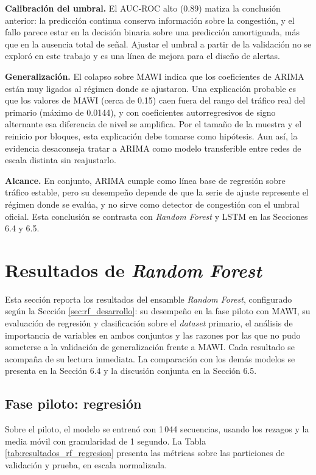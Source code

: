 \documentclass[12pt]{report}
\begin{document}
\textbf{Calibración del umbral.} El AUC-ROC alto (0.89) matiza la conclusión anterior: la predicción continua conserva información sobre la congestión, y el fallo parece estar en la decisión binaria sobre una predicción amortiguada, más que en la ausencia total de señal. Ajustar el umbral a partir de la validación no se exploró en este trabajo y es una línea de mejora para el diseño de alertas.

\textbf{Generalización.} El colapso sobre MAWI indica que los coeficientes de ARIMA están muy ligados al régimen donde se ajustaron. Una explicación probable es que los valores de MAWI (cerca de 0.15) caen fuera del rango del tráfico real del primario (máximo de 0.0144), y con coeficientes autorregresivos de signo alternante esa diferencia de nivel se amplifica. Por el tamaño de la muestra y el reinicio por bloques, esta explicación debe tomarse como hipótesis. Aun así, la evidencia desaconseja tratar a ARIMA como modelo transferible entre redes de escala distinta sin reajustarlo.

\textbf{Alcance.} En conjunto, ARIMA cumple como línea base de regresión sobre tráfico estable, pero su desempeño depende de que la serie de ajuste represente el régimen donde se evalúa, y no sirve como detector de congestión con el umbral oficial. Esta conclusión se contrasta con \textit{Random Forest} y LSTM en las Secciones 6.4 y 6.5.

\section{Resultados de \textit{Random Forest}}
\label{sec:resultados_rf}

Esta sección reporta los resultados del ensamble \textit{Random Forest}, configurado según la Sección \ref{sec:rf_desarrollo}: su desempeño en la fase piloto con MAWI, su evaluación de regresión y clasificación sobre el \textit{dataset} primario, el análisis de importancia de variables en ambos conjuntos y las razones por las que no pudo someterse a la validación de generalización frente a MAWI. Cada resultado se acompaña de su lectura inmediata. La comparación con los demás modelos se presenta en la Sección 6.4 y la discusión conjunta en la Sección 6.5.

\subsection*{Fase piloto: regresión}

Sobre el piloto, el modelo se entrenó con 1\,044 secuencias, usando los rezagos y la media móvil con granularidad de 1 segundo. La Tabla \ref{tab:resultados_rf_regresion} presenta las métricas sobre las particiones de validación y prueba, en escala normalizada.
\end{document}
